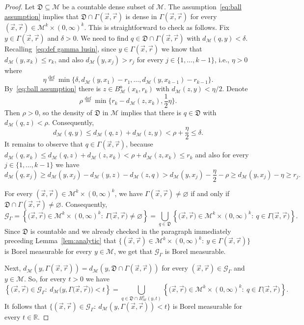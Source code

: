 \documentclass[11pt,reqno]{amsart}
\renewcommand{\le}{\leqslant}
\renewcommand{\ge}{\geqslant}
\renewcommand{\d}{\delta}
\newcommand{\R}{\mathbb R}
\theoremstyle{remark}
\newcommand{\MM}{\mathcal{M}}
\renewcommand{\subset}{\subseteq}
\newcommand{\eqdef}{\stackrel{\mathrm{def}}{=}}
\renewcommand{\emptyset}{\varnothing}
\renewcommand{\1}{\mathbf 1}
\newcommand{\cG}{\mathscr{G}}
\begin{document}
\begin{proof} Let $\mathfrak{D}\subset \MM$ be a countable dense subset of $\MM$. The assumption~\eqref{eq:ball assumption} implies that $\mathfrak{D}\cap \Gamma(\vec{x},\vec{r})$ is dense in $\Gamma(\vec{x},\vec{r})$ for every $(\vec{x},\vec{r})\in \MM^k\times (0,\infty)^k$. This is straightforward to check as follows. Fix $y\in \Gamma(\vec{x},\vec{r})$ and $\d>0$. We need to find $q\in \mathfrak{D}\cap \Gamma(\vec{x},\vec{r})$ with $d_\MM(q,y)<\d$. Recalling~\eqref{eq:def gamma lusin}, since $y\in \Gamma(\vec{x},\vec{r})$ we know that $d_\MM(y,x_k)\le r_k$, and also $d_\MM(y,x_j)>r_j$ for every $j\in \{1,\ldots,k-1\}$, i.e., $\eta>0$ where
$$
\eta\eqdef\min\big\{\d,d_\MM(y,x_1)-r_1,\ldots,d_\MM(y,x_{k-1})-r_{k-1}\big\}.
$$
By~\eqref{eq:ball assumption} there is $z\in B_\MM^{\mathsf{o}}(x_k,r_k)$ with $d_\MM(z,y)<\eta/2$. Denote
$$\rho\eqdef \min\Big\{r_k-d_\MM(z,x_k),\frac12\eta \Big\}.$$
Then $\rho>0$, so the density of $\mathfrak{D}$ in $\MM$ implies that there is $q\in \mathfrak{D}$ with $d_\MM(q,z)<\rho$. Consequently,  $$d_\MM(q,y)\le d_\MM(q,z)+d_\MM(z,y)<\rho+\frac{\eta}{2}\le \d.$$ It remains to observe that $q\in \Gamma(\vec{x},\vec{r})$, because $d_\MM(q,x_k)\le d_\MM(q,z)+d_\MM(z,x_k)< \rho+d_\MM(z,x_k)\le r_k$ and also for every $j\in \{1,\ldots,k-1\}$ we have $$d_\MM(q,x_j)\ge d_\MM(y,x_j)-d_\MM(y,z)-d_\MM(z,q)>d_\MM(y,x_j)-\frac{\eta}{2}-\rho\ge d_\MM(y,x_j)-\eta\ge r_j.$$

For every $(\vec{x},\vec{r})\in \MM^k\times (0,\infty)^k$, we have $\Gamma(\vec{x},\vec{r})\neq\emptyset$  if and only if $\mathfrak{D}\cap \Gamma(\vec{x},\vec{r})\neq \emptyset$. Consequently,
$$
\cG_\Gamma=\left\{\big(\vec{x},\vec{r}\big)\in \MM^k\times (0,\infty)^k:\ \Gamma\big(\vec{x},\vec{r}\big)\neq\emptyset\right\}=\bigcup_{q\in\mathfrak{D}}\left\{\big(\vec{x},\vec{r}\big)\in \MM^k\times (0,\infty)^k:\ q\in \Gamma\big(\vec{x},\vec{r}\big)\right\}.
$$
Since $\mathfrak{D}$ is countable and we already checked in the paragraph immediately preceding Lemma~\ref{lem:analytic}  that $\{(\vec{x},\vec{r})\in \MM^k\times (0,\infty)^k:\ y\in \Gamma(\vec{x},\vec{r})\}$ is Borel measurable  for every $y\in \MM$, we get that $\cG_\Gamma$ is Borel measurable.

Next, $d_\MM(y,\Gamma(\vec{x},\vec{r}))=d_\MM(y,\mathfrak{D}\cap \Gamma(\vec{x},\vec{r}))$ for every $(\vec{x},\vec{r})\in \cG_\Gamma$ and $y\in \MM$. So, for every $t>0$ we have
$$
\left\{\big(\vec{x},\vec{r}\big)\in \cG_\Gamma:\ d_\MM\big(y,\Gamma\big(\vec{x},\vec{r}\big)\big)<t\right\}=\bigcup_{q\in\mathfrak{D}\cap B_\MM^{\mathsf{o}}(y,t)}\left\{\big(\vec{x},\vec{r}\big)\in \MM^k\times (0,\infty)^k:\ q\in \Gamma\big(\vec{x},\vec{r}\big)\right\}.
$$
It follows that $\{(\vec{x},\vec{r})\in \cG_\Gamma:\ d_\MM(y,\Gamma(\vec{x},\vec{r}))<t\}$ is Borel measurable for every $t\in\R$.
\end{proof}
\end{document}

